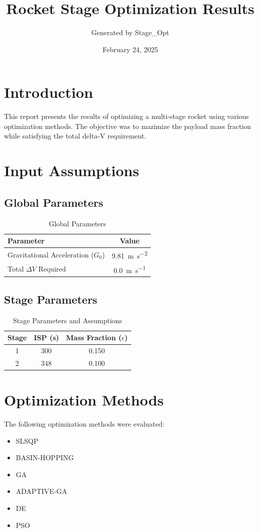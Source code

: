 \documentclass{article}
\title{Rocket Stage Optimization Results}
\author{Generated by Stage\_Opt}
\date{February 24, 2025}
\begin{document}
\maketitle

\section{Introduction}
This report presents the results of optimizing a multi-stage rocket using various optimization methods. The objective was to mazimize the payload mass fraction while satisfying the total delta-V requirement.

\section{Input Assumptions}
\subsection{Global Parameters}
\begin{table}[H]
\centering
\caption{Global Parameters}
\begin{tabular}{lS[table-format=4.2]}
\toprule
Parameter & {Value} \\
\midrule
Gravitational Acceleration ($G_0$) & \SI{9.81}{\meter\per\second\squared} \\
Total $\Delta V$ Required & \SI{0.0}{\meter\per\second} \\
\bottomrule
\end{tabular}
\end{table}

\subsection{Stage Parameters}
\begin{table}[H]
\centering
\caption{Stage Parameters and Assumptions}
\begin{tabular}{cS[table-format=3.0]S[table-format=1.3]}
\toprule
Stage & {ISP (\si{\second})} & {Mass Fraction ($\epsilon$)} \\
 & 300 & 0.150 \\
2 & 348 & 0.100 \\
\bottomrule
\end{tabular}
\end{table}

\section{Optimization Methods}
The following optimization methods were evaluated:
\begin{itemize}
\item SLSQP
\item BASIN-HOPPING
\item GA
\item ADAPTIVE-GA
\item DE
\item PSO
\end{itemize}
\end{document}
